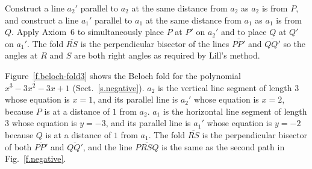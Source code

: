 Construct a line $a_2'$ parallel to $a_2$ at the same distance from $a_2$ as $a_2$ is from $P$, and construct a line $a_1'$ parallel to $a_1$ at the same distance from $a_1$ as $a_1$ is from $Q$. Apply Axiom~6 to simultaneously place $P$ at $P'$ on $a_2'$ and to place $Q$ at $Q'$ on $a_1'$. The fold $\overline{RS}$ is the perpendicular bisector of the lines $\overline{PP'}$ and $\overline{QQ'}$ so the angles at $R$ and $S$ are both right angles as required by Lill's method.

\newpage

Figure~\ref{f.beloch-fold3} shows the Beloch fold for the polynomial $x^3-3x^2-3x+1$ (Sect.~\ref{s.negative}). $a_2$ is the vertical line segment of length $3$ whose equation is $x=1$, and its parallel line is $a_2'$ whose equation is $x=2$, because $P$ is at a distance of $1$ from $a_2$. $a_1$ is the horizontal line segment of length $3$ whose equation is $y=-3$, and its parallel line is $a_1'$ whose equation is $y=-2$ because $Q$ is at a distance of $1$ from $a_1$. The fold $\overline{RS}$ is the perpendicular bisector of both $\overline{PP'}$ and $\overline{QQ'}$, and the line $\overline{PRSQ}$ is the same as the second path in Fig.~\ref{f.negative}.

